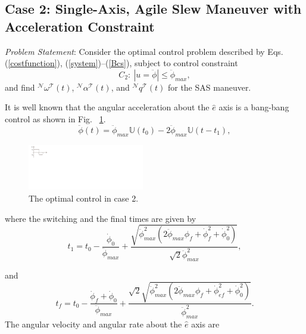 \documentclass[letterpaper, paper,12pt]{AAS}		%
\begin{document}
	\subsection{Case 2: Single-Axis, Agile Slew Maneuver with Acceleration Constraint} 
	
	{\it Problem Statement}: Consider the optimal control problem described by Eqs. (\ref{costfunction}), (\ref{system})--(\ref{Bcs}), subject to control constraint
	\begin{equation}
	C_2: \ |u=\ddot{\phi}|\leq \ddot{\phi}_{max},
	\end{equation}
	and find $^\mathcal{N}\omega^\mathcal{T}(t)$, $^\mathcal{N}\alpha^\mathcal{T}(t)$, and $^\mathcal{N}q^\mathcal{T}(t)$ for the SAS maneuver.
	
	
	 It is well known that the angular acceleration about the $\hat{e}$ axis is a bang-bang control as shown in Fig. ~\ref{bang_bang}.
	\begin{equation}\label{alpha}
	\ddot{\phi}(t)=\ddot{\phi}_{max}\mathbb{U}(t_0)- 2\ddot{\phi}_{max}\mathbb{U}(t-t_1),
	\end{equation}
	
	\begin{figure}[!ht]
	\begin{center}
	\includegraphics[width=2in]{./Figures/Bang_bang}    
	\caption{The optimal control in case 2.}  
	\label{bang_bang}
	\end{center}
	\end{figure}
	where the switching and the final times are given by
	\begin{equation}
	t_1=t_0-\frac{\dot{\phi}_{0}}{\ddot{\phi}_{max}}+\frac{\sqrt{\ddot{\phi}_{max}^2(2\ddot{\phi}_{max}\phi_{f}+\dot{\phi}_{f}^2+\dot{\phi}_{0}^2)}}{\sqrt{2}\ddot{\phi}_{max}^2},
	\end{equation}
	
	
	and
	\begin{equation}
	t_f=t_0-\frac{\dot{\phi}_{f}+\dot{\phi}_{0}}{\ddot{\phi}_{max}}+\frac{\sqrt{2}\sqrt{\ddot{\phi}_{max}^2(2\ddot{\phi}_{max}\phi_{f}+\dot{\phi}_{ef}^2+\dot{\phi}_{0}^2)}}{\ddot{\phi}_{max}^2}.
	\end{equation}
The angular velocity and angular rate about the $\hat{e}$ axis are
\end{document}
